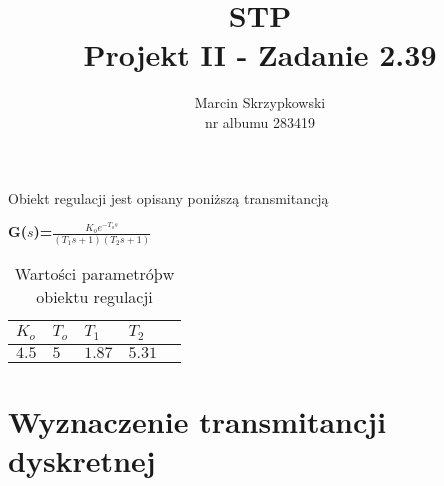 \documentclass[fleqn]{article}
\title{\textbf{STP} \\ \large Projekt II - Zadanie 2.39}
\author{Marcin Skrzypkowski \\ nr albumu 283419}
\begin{document}
\maketitle

\setcounter{page}{0}
\thispagestyle{empty}

\pagebreak
\setcounter{page}{1}


\tableofcontents
\pagebreak


\begin{center}

	Obiekt regulacji jest opisany poniższą transmitancją

	\Large{\textbf{G($s$)=}$\frac{K_oe^{-T_os}}{(T_1s+1)(T_2s+1)}$}
\end{center}

\begin{table}[H]
	\centering
	\label{my-label}
	\begin{tabular}{|l|l|l|l|l|}\hline
		$K_o$ & $T_o$ &$T_1$ &  $T_2$   \\ \hline
		$4.5$ & $5$ & $1.87$ &$5.31$\\ \hline
	\end{tabular}
	\caption{Wartości parametróþw obiektu regulacji}
\end{table}

\section{Wyznaczenie transmitancji dyskretnej}
\end{document}
